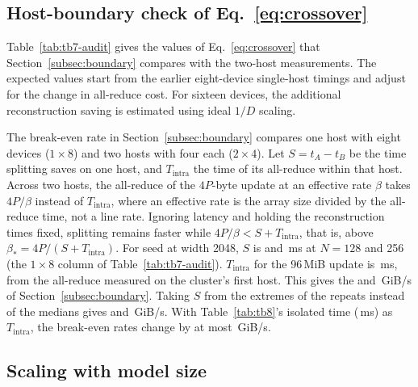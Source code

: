 \subsection{Host-boundary check of Eq.~\ref{eq:crossover}}
\label{sec:boundary-audit}



Table~\ref{tab:tb7-audit} gives the values of Eq.~\ref{eq:crossover} that
Section~\ref{subsec:boundary} compares with the two-host measurements. The expected values
start from the earlier eight-device single-host timings and adjust for the change in
all-reduce cost. For sixteen devices, the additional reconstruction saving is estimated
using ideal $1/D$ scaling.

The break-even rate in Section~\ref{subsec:boundary} compares one host with eight devices
($1\times8$) and two hosts with four each ($2\times4$). Let $S=t_A-t_B$ be the time
splitting saves on one host, and $T_{\mathrm{intra}}$ the time of its all-reduce within
that host. Across two hosts, the all-reduce of the $4P$-byte update at an effective rate
$\beta$ takes $4P/\beta$ instead of $T_{\mathrm{intra}}$, where an effective rate is the
array size divided by the all-reduce time, not a line rate. Ignoring latency and holding
the reconstruction times fixed, splitting remains faster while
$4P/\beta<S+T_{\mathrm{intra}}$, that is, above $\beta_*=4P/(S+T_{\mathrm{intra}})$. For
seed at width 2048, $S$ is \HostSavingSmallN{} and \HostSavingLargeN\,ms at $N=128$ and
256 (the $1\times8$ column of Table~\ref{tab:tb7-audit}). $T_{\mathrm{intra}}$ for the
96\,MiB update is \HostIntra\,ms, from the all-reduce measured on the cluster's first
host. This gives the \HostBreakEvenSmallN{} and \HostBreakEvenLargeN\,GiB/s of
Section~\ref{subsec:boundary}. Taking $S$ from the extremes of the repeats instead of the
medians gives \HostBoundsSmallN{} and \HostBoundsLargeN\,GiB/s. With
Table~\ref{tab:tb8}'s isolated time (\HostIsolatedIntra\,ms) as $T_{\mathrm{intra}}$, the
break-even rates change by at most \HostIsolatedShift\,GiB/s.

\subsection{Scaling with model size}
\label{sec:size}

